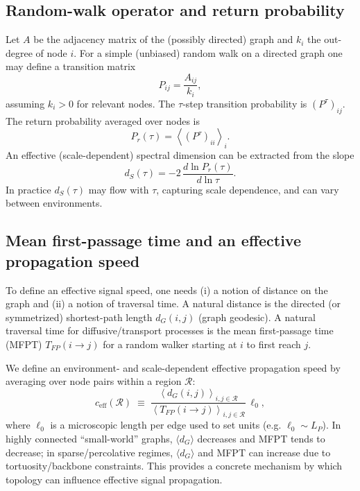 \documentclass[12pt]{iopart}
\begin{document}
\subsection{Random-walk operator and return probability}
Let $A$ be the adjacency matrix of the (possibly directed) graph and $k_i$ the out-degree of node $i$. For a simple (unbiased) random walk on a directed graph one may define a transition matrix
\begin{equation}
P_{ij} = \frac{A_{ij}}{k_i},
\end{equation}
assuming $k_i>0$ for relevant nodes. The $\tau$-step transition probability is $(P^\tau)_{ij}$. The return probability averaged over nodes is
\begin{equation}
P_r(\tau) = \left\langle (P^\tau)_{ii} \right\rangle_i.
\end{equation}
An effective (scale-dependent) spectral dimension can be extracted from the slope
\begin{equation}
d_S(\tau) = -2\,\frac{d\ln P_r(\tau)}{d\ln \tau}.
\end{equation}
In practice $d_S(\tau)$ may flow with $\tau$, capturing scale dependence, and can vary between environments.

\subsection{Mean first-passage time and an effective propagation speed}
To define an effective signal speed, one needs (i) a notion of distance on the graph and (ii) a notion of traversal time. A natural distance is the directed (or symmetrized) shortest-path length $d_G(i,j)$ (graph geodesic). A natural traversal time for diffusive/transport processes is the mean first-passage time (MFPT) $T_{FP}(i\to j)$ for a random walker starting at $i$ to first reach $j$.

We define an environment- and scale-dependent effective propagation speed by averaging over node pairs within a region $\mathcal{R}$:
\begin{equation}
c_{\mathrm{eff}}(\mathcal{R}) \;\equiv\;
\frac{\left\langle d_G(i,j)\right\rangle_{i,j\in\mathcal{R}}}{\left\langle T_{FP}(i\to j)\right\rangle_{i,j\in\mathcal{R}}}\, \ell_0,
\end{equation}
where $\ell_0$ is a microscopic length per edge used to set units (e.g. $\ell_0 \sim L_P$). In highly connected ``small-world'' graphs, $\langle d_G\rangle$ decreases and MFPT tends to decrease; in sparse/percolative regimes, $\langle d_G\rangle$ and MFPT can increase due to tortuosity/backbone constraints. This provides a concrete mechanism by which topology can influence effective signal propagation.
\end{document}
